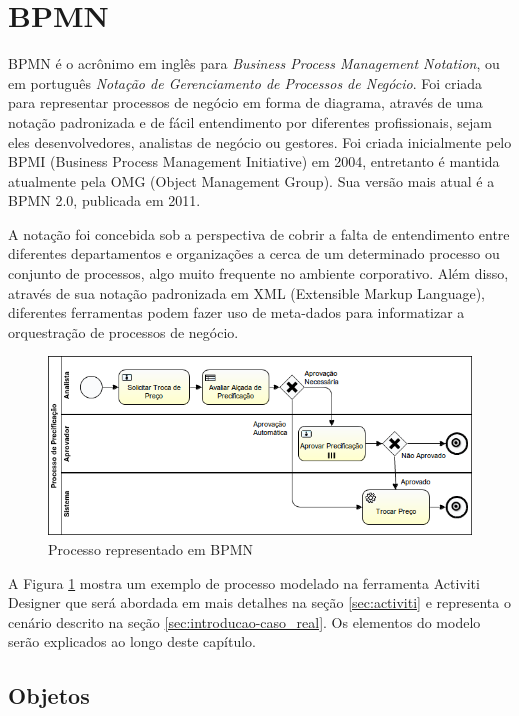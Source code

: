 \section{BPMN}\label{sec:bpm-bpmn}
BPMN\cite{bpmn} é o acrônimo em inglês para \textit{Business Process Management Notation}, ou em português \textit{Notação de Gerenciamento de Processos de Negócio}. Foi criada para representar processos de negócio em forma de diagrama, através de uma notação padronizada e de fácil entendimento por diferentes profissionais, sejam eles desenvolvedores, analistas de negócio ou gestores. Foi criada inicialmente pelo BPMI\cite{bpmi} (Business Process Management Initiative) em 2004, entretanto é mantida atualmente pela OMG\cite{omg} (Object Management Group). Sua versão mais atual é a BPMN 2.0\cite{bpmn20}, publicada em 2011.

A notação foi concebida sob a perspectiva de cobrir a falta de entendimento entre diferentes departamentos e organizações a cerca de um determinado processo ou conjunto de processos, algo muito frequente no ambiente corporativo. Além disso, através de sua notação padronizada em XML\cite{xml} (Extensible Markup Language), diferentes ferramentas podem fazer uso de meta-dados para informatizar a orquestração de processos de negócio.



\begin{figure}[H]
  \centering
  \includegraphics[width=1.0\textwidth]{imagens/ProcessoDePrecificacao.png}
  \caption{Processo representado em BPMN}
  \label{fig:exemplo_bpmn}
\end{figure}

A Figura \ref{fig:exemplo_bpmn} mostra um exemplo de processo modelado na ferramenta Activiti Designer que será abordada em mais detalhes na seção \ref{sec:activiti} e representa o cenário descrito na seção \ref{sec:introducao-caso_real}. Os elementos do modelo serão explicados ao longo deste capítulo.


\subsection{Objetos}\label{sec:bpm-bpmn_objetos}

